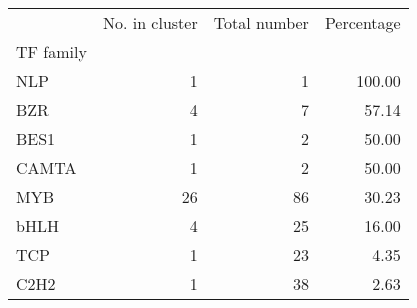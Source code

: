 \begin{tabular}{lrrr}
\toprule
{} &  No. in cluster &  Total number &  Percentage \\
TF family &                 &               &             \\
\midrule
NLP       &               1 &             1 &      100.00 \\
BZR       &               4 &             7 &       57.14 \\
BES1      &               1 &             2 &       50.00 \\
CAMTA     &               1 &             2 &       50.00 \\
MYB       &              26 &            86 &       30.23 \\
bHLH      &               4 &            25 &       16.00 \\
TCP       &               1 &            23 &        4.35 \\
C2H2      &               1 &            38 &        2.63 \\
\bottomrule
\end{tabular}
